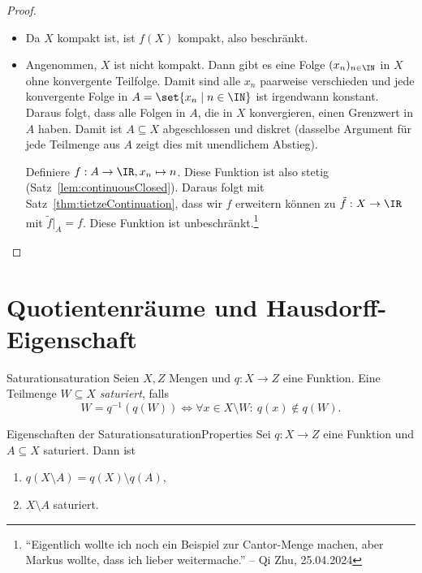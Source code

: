 \documentclass[language=ngerman]{TemplateLecture} %
\begin{document}
\begin{proof}
    \begin{itemize}
        \item[\enquote{$\Rightarrow$}] Da $X$ kompakt ist, ist $f(X)$ kompakt, also beschränkt.
        \item[\enquote{$\Leftarrow$}] Angenommen, $X$ ist nicht kompakt. Dann gibt es eine Folge $(x_n)_{n \in \IN}$ in $X$ ohne konvergente Teilfolge. Damit sind alle $x_n$ paarweise verschieden und jede konvergente Folge in $A = \set{x_n \mid n \in \IN}$ ist irgendwann konstant. 
        Daraus folgt, dass alle Folgen in $A$, die in $X$ konvergieren, einen Grenzwert in $A$ haben. Damit ist $A \subseteq X$ abgeschlossen und diskret (dasselbe Argument für jede Teilmenge aus $A$ zeigt dies mit unendlichem Abstieg).
        
        Definiere $f: A \to \IR, x_n \mapsto n$. Diese Funktion ist also stetig (Satz~\ref{lem:continuousClosed}). Daraus folgt mit Satz~\ref{thm:tietzeContinuation}, dass wir $f$ erweitern können zu $\tilde{f}: X \to \IR$ mit $\tilde{f}|_A = f$. Diese Funktion ist unbeschränkt.\footnote{\enquote{Eigentlich wollte ich noch ein Beispiel zur Cantor-Menge machen, aber Markus wollte, dass ich lieber weitermache.} -- Qi Zhu, 25.04.2024}
    \end{itemize}
\end{proof}


\section{Quotientenräume und Hausdorff-Eigenschaft}
\begin{defi}{Saturation}{saturation}
    Seien $X, Z$ Mengen und $q: X \to Z$ eine Funktion. Eine Teilmenge $W \subseteq X$ \emph{saturiert}, falls 
    \begin{equation*}
        W = q^{-1}(q(W)) \Leftrightarrow \forall x \in X \setminus W: ~ q(x) \notin q(W).
    \end{equation*}
\end{defi}

\begin{lem}{Eigenschaften der Saturation}{saturationProperties}
    Sei $q: X \to Z$ eine Funktion und $A \subseteq X$ saturiert. Dann ist 
    \begin{enumerate}[$(i)$]
        \item $q(X \setminus A) = q(X) \setminus q(A)$, 
        \item $X \setminus A$ saturiert.
    \end{enumerate}
\end{lem}
\end{document}
